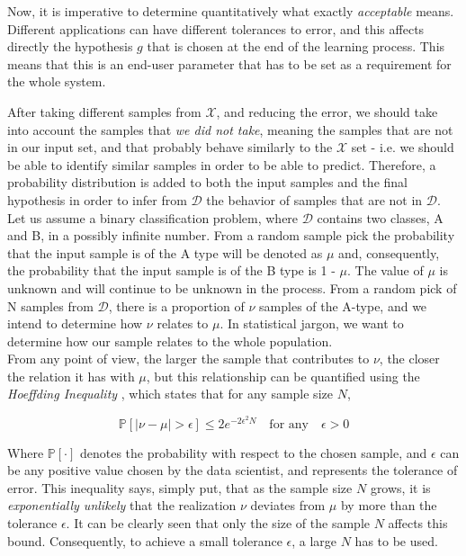 Now, it is imperative to determine quantitatively what exactly \emph{acceptable} means. Different applications can have different tolerances to error, and this affects directly the hypothesis \( g \) that is chosen at the end of the learning process. This means that this is an end-user parameter that has to be set as a requirement for the whole system.

After taking different samples from \( \mathcal{X} \), and reducing the error, we should take into account the samples that \emph{we did not take}, meaning the samples that are not in our input set, and that probably behave similarly to the \( \mathcal{X} \) set - i.e. we should be able to identify similar samples in order to be able to predict. Therefore, a probability distribution is added to both the input samples and the final hypothesis in order to infer from \( \mathcal{D} \) the behavior of samples that are not in \( \mathcal{D} \). Let us assume a binary classification problem, where \( \mathcal{D} \) contains two classes, A and B, in a possibly infinite number. From a random sample pick the probability that the input sample is of the A type will be denoted as \(\mu\) and, consequently, the probability that the input sample is of the B type is 1 - \(\mu\). The value of \(\mu\) is unknown and will continue to be unknown in the process. From a random pick of N samples from \( \mathcal{D} \), there is a proportion of \(\nu\) samples of the A-type, and we intend to determine how \(\nu\) relates to \(\mu\). In statistical jargon, we want to determine how our sample relates to the whole population. \\

From any point of view, the larger the sample that contributes to \(\nu\), the closer the relation it has with \(\mu\), but this relationship can be quantified using the \emph{Hoeffding Inequality} \cite{Hoeffding1963}, which states that for any sample size \(N\),

\begin{equation}
  \mathbb{P}[|\nu -\mu|>\epsilon ]\leq 2e^{-2\epsilon^{2}N} \quad \text{for any}\quad \epsilon>0
\end{equation}

Where \(\mathbb{P}[\cdot]\) denotes the probability with respect to the chosen sample, and \(\epsilon\) can be any positive value chosen by the data scientist, and represents the tolerance of error. This inequality says, simply put, that as the sample size \(N\) grows, it is \emph{exponentially unlikely} that the realization \(\nu\) deviates from \(\mu\) by more than the tolerance \(\epsilon\). It can be clearly seen that only the size of the sample \(N\) affects this bound. Consequently, to achieve a small tolerance \(\epsilon\), a large \(N\) has to be used.\\

